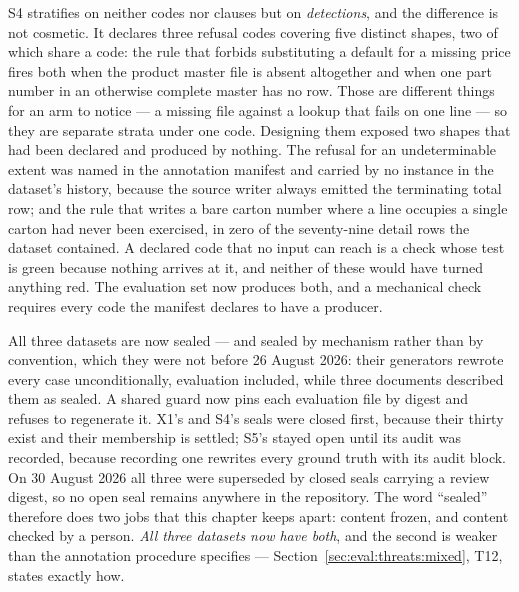 S4 stratifies on neither codes nor clauses but on \emph{detections}, and the difference is
not cosmetic. It declares three refusal codes covering five distinct shapes, two of which
share a code: the rule that forbids substituting a default for a missing price fires both
when the product master file is absent altogether and when one part number in an otherwise
complete master has no row. Those are different things for an arm to notice --- a missing
file against a lookup that fails on one line --- so they are separate strata under one code.
Designing them exposed two shapes that had been declared and produced by nothing. The
refusal for an undeterminable extent was named in the annotation manifest and carried by no
instance in the dataset's history, because the source writer always emitted the terminating
total row; and the rule that writes a bare carton number where a line occupies a single
carton had never been exercised, in zero of the seventy-nine detail rows the dataset
contained. A declared code that no input can reach is a check whose test is green because
nothing arrives at it, and neither of these would have turned anything red. The evaluation
set now produces both, and a mechanical check requires every code the manifest declares to
have a producer.

All three datasets are now sealed --- and sealed by mechanism rather than by convention,
which they were not before 26 August 2026: their generators rewrote every case
unconditionally, evaluation included, while three documents described them as sealed. A
shared guard now pins each evaluation file by digest and refuses to regenerate it. X1's and
S4's seals were closed first, because their thirty exist and their membership is settled;
S5's stayed open until its audit was recorded, because recording one rewrites every ground
truth with its audit block. On 30 August 2026 all three were superseded by closed seals
carrying a review digest, so no open seal remains anywhere in the repository. The word
``sealed'' therefore does two jobs that this chapter keeps apart: content frozen, and content
checked by a person. \emph{All three datasets now have both}, and the second is weaker than
the annotation procedure specifies --- Section~\ref{sec:eval:threats:mixed}, T12, states
exactly how.

